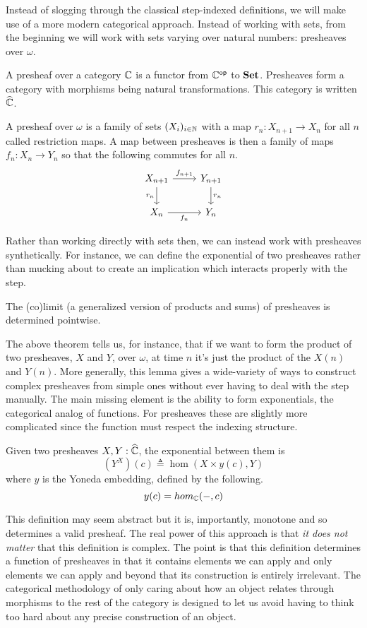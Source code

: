 Instead of slogging through the classical step-indexed definitions, we
will make use of a more modern categorical approach. Instead of
working with sets, from the beginning we will work with sets varying
over natural numbers: presheaves over $\omega$.
\begin{defn}
  A presheaf over a category $\mathbb{C}$ is a functor from $\mathbb{C}^{\mathsf{op}}$ to
  $\mathbf{Set}$. Presheaves form a category with morphisms being natural
  transformations. This category is written $\widehat{\mathbb{C}}$.
\end{defn}
\begin{example}
  A presheaf over $\omega$ is a family of sets $(X_i)_{i \in \mathbb{N}}$
  with a map $r_n : X_{n + 1} \to X_n$ for all $n$ called restriction
  maps. A map between presheaves is then a family of maps
  $f_n : X_n \to Y_n$ so that the following commutes for all $n$.
  \[
    \begin{tikzcd}
      X_{n + 1} \ar[r, "f_{n + 1}"] \ar[d, swap, "r_n"] & Y_{n + 1} \ar[d, "r_n"]\\
      X_n \ar[r, swap, "f_n"] & Y_n
    \end{tikzcd}
  \]
\end{example}
Rather than working directly with sets then, we can instead work with
presheaves synthetically. For instance, we can define the exponential
of two presheaves rather than mucking about to create an implication
which interacts properly with the step.
\begin{lem}
  The (co)limit (a generalized version of products and sums) of
  presheaves is determined pointwise.
\end{lem}
The above theorem tells us, for instance, that if we want to form the
product of two presheaves, $X$ and $Y$, over $\omega$, at time $n$ it's just the
product of the $X(n)$ and $Y(n)$. More generally, this lemma gives a
wide-variety of ways to construct complex presheaves from simple ones
without ever having to deal with the step manually. The main missing
element is the ability to form exponentials, the categorical analog of
functions. For presheaves these are slightly more complicated since
the function must respect the indexing structure.
\begin{lem}
  Given two presheaves $X, Y : \widehat{\mathbb{C}}$, the exponential
  between them is
  \[
    (Y^X)(c) \triangleq \hom(X \times y(c), Y)
  \]
  where $y$ is the Yoneda embedding, defined by the following.
  \[
    y(c) = hom_{\mathbb{C}}(-, c)
  \]
\end{lem}
This definition may seem abstract but it is, importantly,
monotone and so determines a valid presheaf. The real power of this
approach is that \emph{it does not matter} that this definition is
complex. The point is that this definition determines a function of
presheaves in that it contains elements we can apply and only elements
we can apply and beyond that its construction is entirely
irrelevant. The categorical methodology of only caring about how an
object relates through morphisms to the rest of the category is
designed to let us avoid having to think too hard about any precise
construction of an object. %

